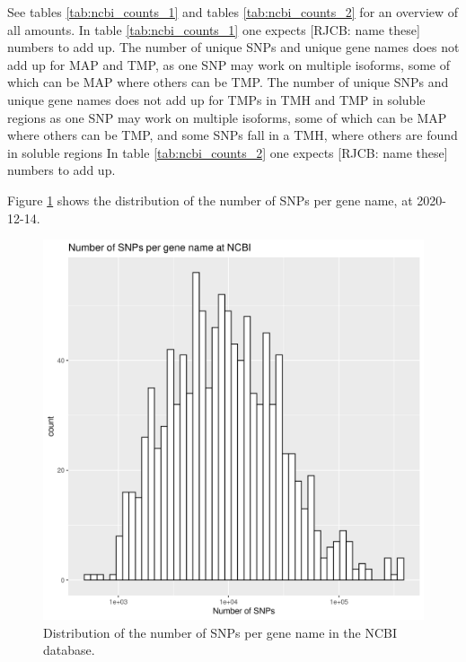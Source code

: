See tables \ref{tab:ncbi_counts_1} and tables \ref{tab:ncbi_counts_2}
for an overview of all amounts.
In table \ref{tab:ncbi_counts_1} one expects [RJCB: name these]
numbers to add up. 
The number of unique SNPs and unique gene names
does not add up for MAP and TMP,
as one SNP may work on multiple isoforms, some of which can be MAP
where others can be TMP.
The number of unique SNPs and unique gene names
does not add up for TMPs in TMH and TMP in soluble regions
as one SNP may work on multiple isoforms, some of which can be MAP
where others can be TMP, and some SNPs fall in a TMH, where others
are found in soluble regions
In table \ref{tab:ncbi_counts_2} one expects [RJCB: name these]
numbers to add up. 






Figure \ref{fig:snps_per_gene_name_ncbi} shows the distribution of the
number of SNPs per gene name, at 2020-12-14.

\begin{figure}[!htbp]
  \includegraphics[width=\textwidth]{ncbi_peregrine_results/fig_snps_per_gene_name_ncbi.png}
  \caption{
    Distribution of the number of SNPs per gene name in the NCBI database.
  }
  \label{fig:snps_per_gene_name_ncbi}
\end{figure}

